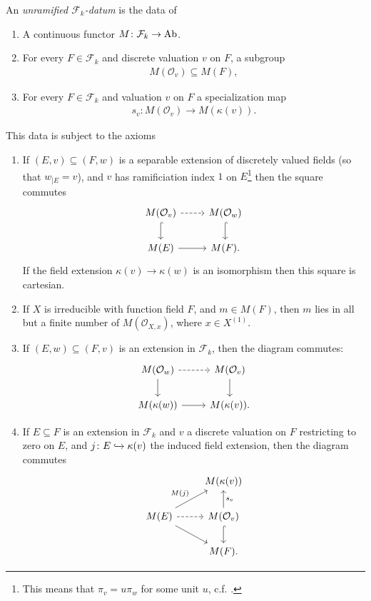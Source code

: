 \documentclass[11pt,openany]{book}
\begin{document}
\begin{definition}
\label{def:unramified-Fk-datum}
An \textit{unramified $\mathcal{F}_k$-datum} is the data of
\begin{enumerate}
    \item[\textbf{D1}] A continuous functor $M \colon \mathcal{F}_k \to \mathrm{Ab}$.
    \item[\textbf{D2}] For every $F\in \mathcal{F}_k$ and discrete valuation $v$ on $F$, a subgroup
    \begin{align*}
        M(\mathcal{O}_v) \subseteq M(F),
    \end{align*}
    \item[\textbf{D3}] For every $F\in \mathcal{F}_k$ and valuation $v$ on $F$ a specialization map
    \begin{align*}
        s_v \colon M(\mathcal{O}_v) \to M(\kappa(v)).
    \end{align*}
\end{enumerate}
This data is subject to the axioms
\begin{enumerate}
    \item[\textbf{A1}] If $(E,v) \subseteq (F,w)$ is a separable extension of discretely valued fields (so that $w_{|E} = v$), and $v$ has ramificiation index $1$ on $E$\footnote{%
    This means that $\pi_v = u\pi_w$ for some unit $u$, c.f. \cite[09E4]{Stacks}.
    }
    then the square commutes
\[ \begin{tikzcd}
    M(\mathcal{O}_v)\dar[hook]\rar[dashed] & M(\mathcal{O}_w)\dar[hook]\\
    M(E)\rar & M(F).
\end{tikzcd} \]
If the field extension $\kappa(v) \to \kappa(w)$ is an isomorphism then this square is cartesian.

    \item[\textbf{A2}] If $X$ is irreducible with function field $F$, and $m\in M(F)$, then $m$ lies in all but a finite number of $M(\mathcal{O}_{X,x})$, where $x\in X^{(1)}$.
    \item[\textbf{A3(i)}] If $(E,w) \subseteq (F,v)$ is an extension in $\mathcal{F}_k$, then the diagram commutes:
\[ \begin{tikzcd}
    M(\mathcal{O}_w)\dar\rar[dashed] & M(\mathcal{O}_v)\dar\\
    M(\kappa(w))\rar & M(\kappa(v)).
\end{tikzcd} \]
    
    \item[\textbf{A3(ii)}] If $E \subseteq F$ is an extension in $\mathcal{F}_k$ and $v$ a discrete valuation on $F$ restricting to zero on $E$, and $j \colon E \xhookrightarrow{} \kappa(v)$ the induced field extension, then the diagram commutes
\[ \begin{tikzcd}
     & M(\kappa(v))\\
    M(E)\ar[ur,"M(j)" above left]\ar[dr]\rar[dashed] & M(\mathcal{O}_v)\dar[hook]\uar["s_v" right]\\
     & M(F).
\end{tikzcd} \]
    

\end{enumerate}
\end{definition}
\end{document}
